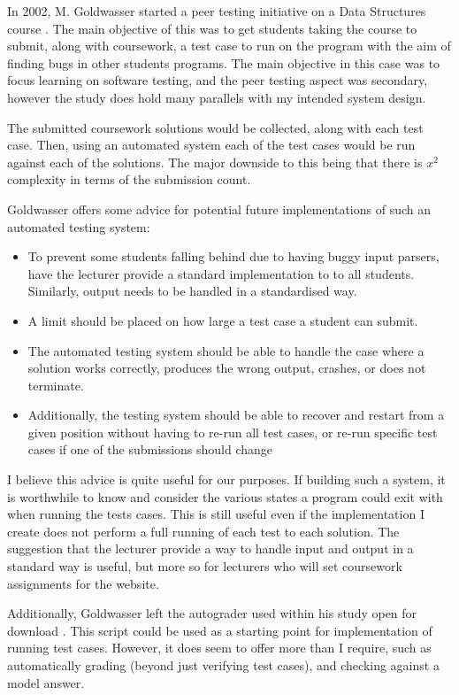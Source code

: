 \documentclass[a4paper,11pt]{report}
\begin{document}
In 2002, M. Goldwasser started a peer testing initiative on a Data Structures course \cite{goldwasser_gimmick_2002}.  The main objective of this was to get students taking the course to submit, along with coursework, a test case to run on the program with the aim of finding bugs in other students programs. The main objective in this case was to focus learning on software testing, and the peer testing aspect was secondary, however the study does hold many parallels with my intended system design.\par
The submitted coursework solutions would be collected, along with each test case. Then, using an automated system each of the test cases would be run against each of the solutions. The major downside to this being that there is $x^2$ complexity in terms of the submission count.\par
Goldwasser offers some advice for potential future implementations of such an automated testing system:
\begin{itemize}
 \item To prevent some students falling behind due to having buggy input parsers, have the lecturer provide a standard implementation to to all students. Similarly, output needs to be handled in a standardised way.
 \item A limit should be placed on how large a test case a student can submit.
 \item The automated testing system should be able to handle the case where a solution works correctly, produces the wrong output, crashes, or does not terminate.
 \item Additionally, the testing system should be able to recover and restart from a given position without having to re-run all test cases, or re-run specific test cases if one of the submissions should change
\end{itemize}
I believe this advice is quite useful for our purposes. If building such a system, it is worthwhile to know and consider the various states a program could exit with when running the tests cases. This is still useful even if the implementation I create does not perform a full running of each test to each solution. The suggestion that the lecturer provide a way to handle input and output in a standard way is useful, but more so for lecturers who will set coursework assignments for the website.\par
Additionally, Goldwasser left the autograder used within his study open for download \cite{goldwasser_autograde_2002}. This script could be used as a starting point for implementation of running test cases. However, it does seem to offer more than I require, such as automatically grading (beyond just verifying test cases), and checking against a model answer.
\end{document}
